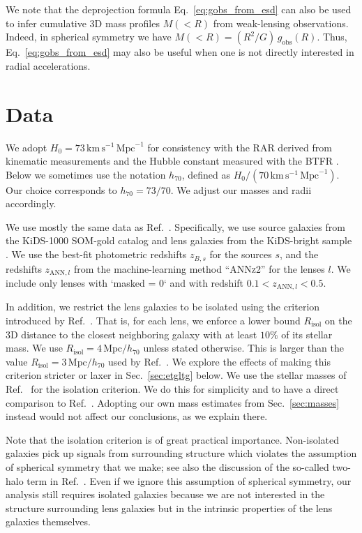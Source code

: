 \documentclass[a4paper,11pt]{article}
\begin{document}
We note that the deprojection formula Eq.~\eqref{eq:gobs_from_esd} can also be used to infer cumulative 3D mass profiles $M(<R)$ from weak-lensing observations.
Indeed, in spherical symmetry we have $M(< R) = (R^2/G) \, g_{\mathrm{obs}}(R)$.
Thus, Eq.~\eqref{eq:gobs_from_esd} may also be useful when one is not directly interested in radial accelerations.

\section{Data}
\label{sec:data}

We adopt $H_0 = 73\,\mathrm{km}\,\mathrm{s}^{-1}\,\mathrm{Mpc}^{-1}$ for consistency with the RAR derived from kinematic measurements \citep{Lelli2017b} and the Hubble constant measured with the BTFR \citep{Schombert2020}.
Below we sometimes use the notation $h_{70}$, defined as $H_0/(70\,\mathrm{km}\,\mathrm{s}^{-1}\,\mathrm{Mpc}^{-1})$.
Our choice corresponds to $h_{70} = 73/70$.
We adjust our masses and radii accordingly.

We use mostly the same data as Ref.~\cite{Brouwer2021}.
Specifically, we use source galaxies from the KiDS-1000 SOM-gold catalog \citep{Kuijken2019,Wright2020,Giblin2021,Hildebrandt2021} and lens galaxies from the KiDS-bright sample \citep{Bilicki2021}.
We use the best-fit photometric redshifts $z_{B,s}$ for the sources $s$, and the redshifts $z_{\mathrm{ANN},l}$ from the machine-learning method ``\textsc{ANNz}2'' \citep{Sadeh2016} for the lenses $l$.
We include only lenses with `masked = 0` and with redshift $0.1 < z_{\mathrm{ANN},l} < 0.5$.

In addition, we restrict the lens galaxies to be isolated using the criterion introduced by Ref.~\cite{Brouwer2021}.
That is, for each lens, we enforce a lower bound $R_{\mathrm{isol}}$ on the 3D distance to the closest neighboring galaxy with at least $10\%$ of its stellar mass.
We use $R_{\mathrm{isol}} = 4\,\mathrm{Mpc}/h_{70}$ unless stated otherwise.
This is larger than the value $R_{\mathrm{isol}} = 3\,\mathrm{Mpc}/h_{70}$ used by Ref.~\cite{Brouwer2021}.
We explore the effects of making this criterion stricter or laxer in Sec.~\ref{sec:etgltg} below.
We use the stellar masses of Ref.~\cite{Brouwer2021} for the isolation criterion.
We do this for simplicity and to have a direct comparison to Ref.~\cite{Brouwer2021}.
Adopting our own mass estimates from Sec.~\ref{sec:masses} instead would not affect our conclusions, as we explain there.

Note that the isolation criterion is of great practical importance.
Non-isolated galaxies pick up signals from surrounding structure which violates the assumption of spherical symmetry that we make; see also the discussion of the so-called two-halo term in Ref.~\cite{Brouwer2021}.
Even if we ignore this assumption of spherical symmetry, our analysis still requires isolated galaxies because we are not interested in the structure surrounding lens galaxies but in the intrinsic properties of the lens galaxies themselves.
\end{document}
